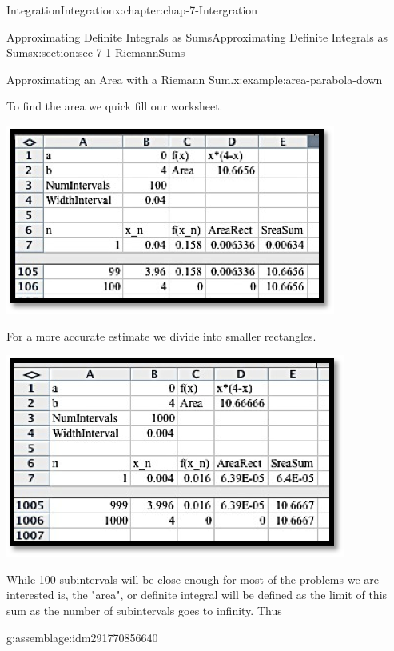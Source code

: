 \documentclass[oneside,10pt,]{book}
\numberwithin{equation}{section}
\begin{document}
\begin{chapterptx}{Integration}{}{Integration}{}{}{x:chapter:chap-7-Intergration}
\begin{sectionptx}{Approximating Definite Integrals as Sums}{}{Approximating Definite Integrals as Sums}{}{}{x:section:sec-7-1-RiemannSums}
\begin{example}{Approximating an Area with a Riemann Sum.}{x:example:area-parabola-down}
\par
To find the area we quick fill our worksheet.%
\begin{sidebyside}{1}{0.25}{0.25}{0}%
\begin{sbspanel}{0.5}%
\includegraphics[width=\linewidth]{images/sec7-1-10.png}
\end{sbspanel}%
\end{sidebyside}%
\par
For a more accurate estimate we divide into smaller rectangles.%
\begin{sidebyside}{1}{0.25}{0.25}{0}%
\begin{sbspanel}{0.5}%
\includegraphics[width=\linewidth]{images/sec7-1-11.png}
\end{sbspanel}%
\end{sidebyside}%
\end{example}
While 100 subintervals will be close enough for most of the problems we are interested is, the "area", or definite integral will be defined as the limit of this sum as the number of subintervals goes to infinity.  Thus%
\begin{assemblage}{}{g:assemblage:idm291770856640}%

\end{assemblage}
\end{sectionptx}
\end{chapterptx}
\end{document}
